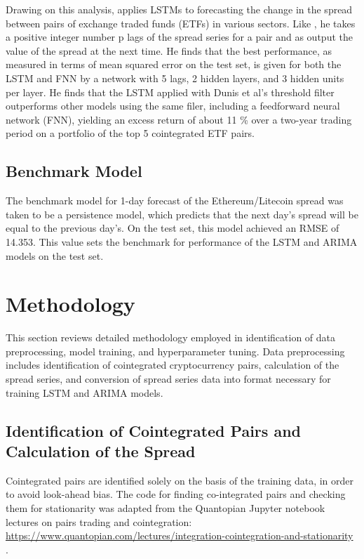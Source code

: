 \documentclass{article}
\begin{document}
Drawing on this analysis, \cite{van2017pairs} applies LSTMs to forecasting the change in the spread between pairs of exchange traded funds (ETFs) in various sectors. Like \cite{dunis2006modelling}, he takes a positive integer number p lags of the spread series for a pair and as output the value of the spread at the next time. He finds that the best performance, as measured in terms of mean squared error on the test set, is given for both the LSTM and FNN by a network with 5 lags, 2 hidden layers, and 3 hidden units per layer. He finds that the LSTM applied with Dunis et al's threshold filter outperforms other models using the same filer, including a feedforward neural network (FNN), yielding an excess return of about 11 \% over a two-year trading period on a portfolio of the top 5 cointegrated ETF pairs. 

\subsection{Benchmark Model}

The benchmark model for 1-day forecast of the Ethereum/Litecoin spread was taken to be a persistence model, which predicts that the next day's spread will be equal to the previous day's. On the test set, this model achieved an RMSE of 14.353. This value sets the benchmark for performance of the LSTM and ARIMA models on the test set. 


\section{Methodology}

This section reviews detailed methodology employed in identification of data preprocessing, model training, and hyperparameter tuning. Data preprocessing includes identification of cointegrated cryptocurrency pairs, calculation of the spread series, and conversion of spread series data into format necessary for training LSTM and ARIMA models. 

\subsection{Identification of Cointegrated Pairs and Calculation of the Spread}

Cointegrated pairs are identified solely on the basis of the training data, in order to avoid look-ahead bias. The code for finding co-integrated pairs and checking them for stationarity was adapted from the Quantopian Jupyter notebook lectures on pairs trading and cointegration: \url{https://www.quantopian.com/lectures/integration-cointegration-and-stationarity} \cite{quantopian_cointegration}.
\end{document}
